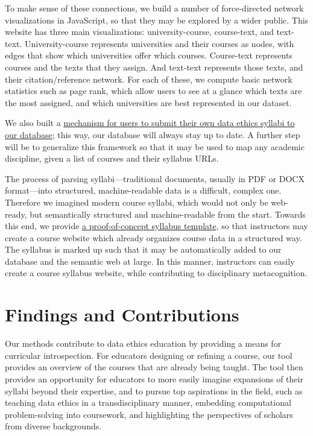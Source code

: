 \documentclass[
]{article}
\begin{document}
To make sense of these connections, we build a number of force-directed
network visualizations in JavaScript, so that they may be explored by a
wider public. This website has three main visualizations:
university-course, course-text, and text-text. University-course
represents universities and their courses as nodes, with edges that show
which universities offer which courses. Course-text represents courses
and the texts that they assign. And text-text represents those texts,
and their citation/reference network. For each of these, we compute
basic network statistics such as page rank, which allow users to see at
a glance which texts are the most assigned, and which universities are
best represented in our dataset.

We also built a \href{https://data-ethics.tech/submit}{mechanism for
users to submit their own data ethics syllabi to our database}; this
way, our database will always stay up to date. A further step will be to
generalize this framework so that it may be used to map any academic
discipline, given a list of courses and their syllabus URLs.

The process of parsing syllabi---traditional documents, usually in PDF
or DOCX format---into structured, machine-readable data is a difficult,
complex one. Therefore we imagined modern course syllabi, which would
not only be web-ready, but semantically structured and machine-readable
from the start. Towards this end, we provide
\href{https://github.com/JonathanReeve/template-course-website}{a
proof-of-concept syllabus template}, so that instructors may create a
course website which already organizes course data in a structured way.
The syllabus is marked up such that it may be automatically added to our
database and the semantic web at large. In this manner, instructors can
easily create a course syllabus website, while contributing to
disciplinary metacognition.

\hypertarget{findings-and-contributions}{%
\section{Findings and Contributions}\label{findings-and-contributions}}

Our methods contribute to data ethics education by providing a means for
curricular introspection. For educators designing or refining a course,
our tool provides an overview of the courses that are already being
taught. The tool then provides an opportunity for educators to more
easily imagine expansions of their syllabi beyond their expertise, and
to pursue top aspirations in the field, such as teaching data ethics in
a transdisciplinary manner, embedding computational problem-solving into
coursework, and highlighting the perspectives of scholars from diverse
backgrounds.
\end{document}
